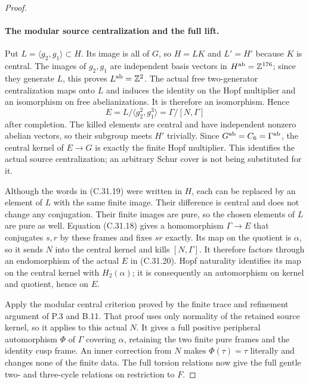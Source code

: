 \begin{proof}
\paragraph{The modular source centralization and the full lift.}
Put $L=\langle g_2,g_1\rangle\subset H$. Its image is all of $G$,
so $H=LK$ and $L'=H'$ because $K$ is central. The images of
$g_2,g_1$ are independent basis vectors in $H^{\rm ab}=\mathbb Z^{176}$;
since they generate $L$, this proves $L^{\rm ab}=\mathbb Z^2$.
The actual free two-generator centralization maps onto $L$ and
induces the identity on the Hopf multiplier and an isomorphism on
free abelianizations. It is therefore an isomorphism. Hence
\[
              E=L/\langle g_2^2,g_1^3\rangle
                 =\Gamma/[N,\Gamma]
 \tag{C.31.20}
\]
after completion. The killed elements are central and have
independent nonzero abelian vectors, so their subgroup meets
$H'$ trivially. Since $G^{\rm ab}=C_6=\Gamma^{\rm ab}$,
the central kernel of $E\to G$ is exactly the finite Hopf
multiplier. This identifies the actual source centralization;
an arbitrary Schur cover is not being substituted for it.

Although the words in (C.31.19) were written in $H$, each can be
replaced by an element of $L$ with the same finite image. Their
difference is central and does not change any conjugation. Their
finite images are pure, so the chosen elements of $L$ are pure as
well. Equation (C.31.18) gives a homomorphism $\Gamma\to E$ that
conjugates $s,r$ by these frames and fixes $sr$ exactly. Its map on
the quotient is $\alpha$, so it sends $N$ into the central kernel
and kills $[N,\Gamma]$. It therefore factors through an endomorphism
of the actual $E$ in (C.31.20). Hopf naturality identifies its map on the
central kernel with $H_2(\alpha)$; it is consequently an
automorphism on kernel and quotient, hence on $E$.

Apply the modular central criterion proved by the finite trace and
refinement argument of P.3 and B.11. That proof uses only normality
of the retained source kernel, so it applies to this actual $N$.
It gives a full positive peripheral automorphism $\Phi$ of $\Gamma$
covering $\alpha$, retaining the two finite pure frames and the
identity cusp frame. An inner correction from $N$ makes
$\Phi(\tau)=\tau$ literally and changes none of the finite data.
The full torsion relations now give the full gentle two- and
three-cycle relations on restriction to $F$.


\end{proof}
